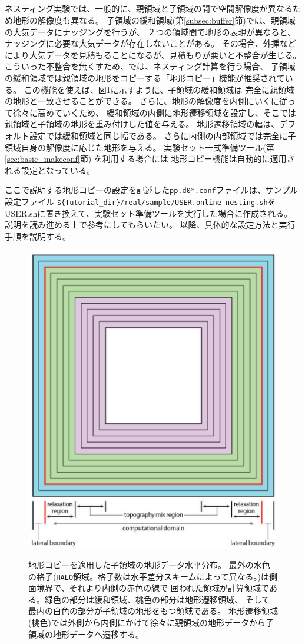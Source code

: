 \subsection{\SubsecCopyTopo} \label{subsec:nest_topo}
ネスティング実験では、一般的に、親領域と子領域の間で空間解像度が異なるため地形の解像度も異なる。
子領域の緩和領域(第\ref{subsec:buffer}節)では、親領域の大気データにナッジングを行うが、
２つの領域間で地形の表現が異なると、ナッジングに必要な大気データが存在しないことがある。
その場合、外挿などにより大気データを見積もることになるが、見積もりが悪いと不整合が生じる。
%
こういった不整合を無くすため、\scalerm では、ネスティング計算を行う場合、
子領域の緩和領域では親領域の地形をコピーする「地形コピー」機能が推奨されている。
この機能を使えば、図\ref{fig_topocopy}に示すように、子領域の緩和領域は
完全に親領域の地形と一致させることができる。
さらに、地形の解像度を内側にいくに従って徐々に高めていくため、
緩和領域の内側に地形遷移領域を設定し、そこでは親領域と子領域の地形を重み付けした値を与える。
地形遷移領域の幅は、デフォルト設定では緩和領域と同じ幅である。
さらに内側の内部領域では完全に子領域自身の解像度に応じた地形を与える。
実験セット一式準備ツール(第\ref{sec:basic_makeconf}節) を利用する場合には
地形コピー機能は自動的に適用される設定となっている。


ここで説明する地形コピーの設定を記述した\verb|pp.d0*.conf|ファイルは、サンプル設定ファイル
\verb|${Tutorial_dir}/real/sample/USER.online-nesting.sh|を
USER.shに置き換えて、実験セット準備ツールを実行した場合に作成される。
説明を読み進める上で参考にしてもらいたい。
%
以降、具体的な設定方法と実行手順を説明する。


\begin{figure}[htb]
\begin{center}
  \includegraphics[width=0.4\hsize]{./figure/topo_copy.eps}\\
  \caption{地形コピーを適用した子領域の地形データ水平分布。
最外の水色の格子(\texttt{HALO}領域。格子数は水平差分スキームによって異なる。)は側面境界で、それより内側の赤色の線で
囲われた領域が計算領域である。緑色の部分は緩和領域、桃色の部分は地形遷移領域、
そして最内の白色の部分が子領域の地形をもつ領域である。
地形遷移領域(桃色)では外側から内側にかけて徐々に親領域の地形データから子領域の地形データへ遷移する。}
  \label{fig_topocopy}
\end{center}
\end{figure}


